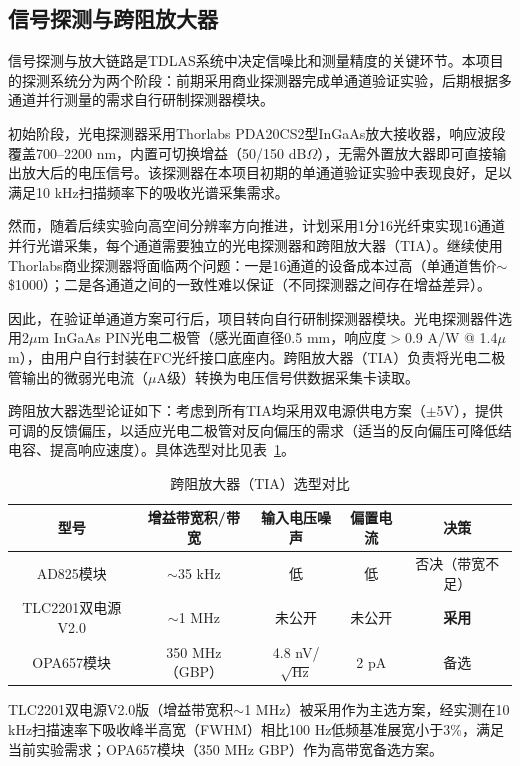 \subsection{信号探测与跨阻放大器}

信号探测与放大链路是TDLAS系统中决定信噪比和测量精度的关键环节。本项目的探测系统分为两个阶段：前期采用商业探测器完成单通道验证实验，后期根据多通道并行测量的需求自行研制探测器模块。

初始阶段，光电探测器采用Thorlabs PDA20CS2型InGaAs放大接收器，响应波段覆盖700--2200 nm，内置可切换增益（50/150 dB$\Omega$），无需外置放大器即可直接输出放大后的电压信号。该探测器在本项目初期的单通道验证实验中表现良好，足以满足10 kHz扫描频率下的吸收光谱采集需求。

然而，随着后续实验向高空间分辨率方向推进，计划采用1分16光纤束实现16通道并行光谱采集，每个通道需要独立的光电探测器和跨阻放大器（TIA）。继续使用Thorlabs商业探测器将面临两个问题：一是16通道的设备成本过高（单通道售价$\sim$\$1000）；二是各通道之间的一致性难以保证（不同探测器之间存在增益差异）。

因此，在验证单通道方案可行后，项目转向自行研制探测器模块。光电探测器件选用2$\mu$m InGaAs PIN光电二极管（感光面直径0.5 mm，响应度$>$0.9 A/W @ 1.4$\mu$m），由用户自行封装在FC光纤接口底座内。跨阻放大器（TIA）负责将光电二极管输出的微弱光电流（$\mu$A级）转换为电压信号供数据采集卡读取。

跨阻放大器选型论证如下：考虑到所有TIA均采用双电源供电方案（$\pm$5V），提供可调的反馈偏压，以适应光电二极管对反向偏压的需求（适当的反向偏压可降低结电容、提高响应速度）。具体选型对比见表~\ref{tab:tia_selection}。

\begin{table}[!htp]
	\centering
	\caption{跨阻放大器（TIA）选型对比}
	\label{tab:tia_selection}
	\begin{tabular}{ccccc}
		\toprule
		\textbf{型号} & \textbf{增益带宽积/带宽} & \textbf{输入电压噪声} & \textbf{偏置电流} & \textbf{决策} \\
		\midrule
		AD825模块 & $\sim$35 kHz & 低 & 低 & 否决（带宽不足） \\
		TLC2201双电源V2.0 & $\sim$1 MHz & 未公开 & 未公开 & \textbf{采用} \\
		OPA657模块 & 350 MHz（GBP） & 4.8 nV/$\sqrt{\text{Hz}}$ & 2 pA & 备选 \\
		\bottomrule
	\end{tabular}
\end{table}

TLC2201双电源V2.0版（增益带宽积$\sim$1 MHz）被采用作为主选方案，经实测在10 kHz扫描速率下吸收峰半高宽（FWHM）相比100 Hz低频基准展宽小于3\%，满足当前实验需求；OPA657模块（350 MHz GBP）作为高带宽备选方案。

